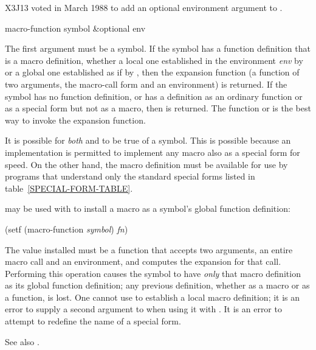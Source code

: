 \begin{newer}
X3J13 voted in March 1988 
to add an optional environment argument to .

\begin{defun}[Function]
macro-function symbol &optional env

The first argument must be a symbol.  If the symbol has a function definition
that is a macro definition, whether a local one established in the
environment {\it env} by  or a global one established as
if by ,
then the expansion function
(a function of two arguments, the macro-call form and an environment)
is returned.
If the symbol has no function definition, or has a definition
as an ordinary function or as a special form but not as a macro, then
{\false} is returned.  The function  or 
is the best way to invoke the expansion function.

It is possible for {\it both}  and 
to be true of a symbol.  This is possible because an implementation is
permitted to implement any macro also as a special form for speed.
On the other hand, the macro definition must be available
for use by programs that understand only the standard special forms
listed in table~\ref{SPECIAL-FORM-TABLE}.

 may be used with  to install
a macro as a symbol's global function definition:
\begin{lisp}
(setf (macro-function {\it symbol}) {\it fn})
\end{lisp}
The value installed must be a function that accepts two arguments,
an entire macro call and an environment, and computes the expansion for that call.
Performing this operation causes the symbol to have {\it only} that
macro definition as its global function definition; any previous
definition, whether as a macro or as a function, is lost.
One cannot use  to establish a local macro definition;
it is an error to supply a second argument to 
when using it with .
It is an error to attempt to redefine the name of a special form.

See also .
\end{defun}
\end{newer}

